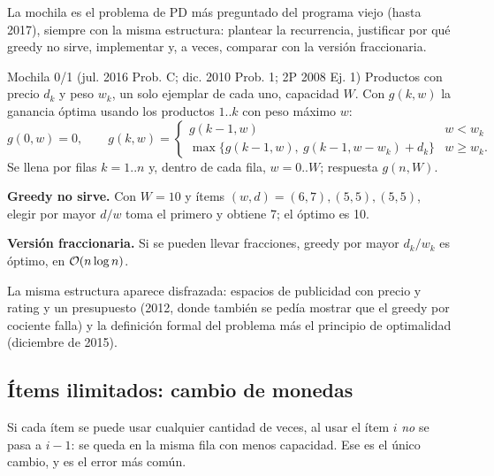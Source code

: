 La mochila es el problema de PD más preguntado del programa viejo (hasta
2017), siempre con la misma estructura: plantear la recurrencia, justificar
por qué greedy no sirve, implementar y, a veces, comparar con la versión
fraccionaria.

\begin{problema}{Mochila 0/1 (jul. 2016 Prob. C; dic. 2010 Prob. 1; 2P 2008 Ej. 1)}
Productos con precio $d_k$ y peso $w_k$, un solo ejemplar de cada uno,
capacidad $W$. Con $g(k,w)$ la ganancia óptima usando los productos
$1..k$ con peso máximo $w$:
\[
g(0,w)=0,\qquad
g(k,w)=\begin{cases}g(k-1,w) & w<w_k\\ \max\{g(k-1,w),\ g(k-1,w-w_k)+d_k\} & w\ge w_k.\end{cases}
\]
Se llena por filas $k=1..n$ y, dentro de cada fila, $w=0..W$; respuesta
$g(n,W)$.

\textbf{Greedy no sirve.} Con $W=10$ y ítems $(w,d)=(6,7),(5,5),(5,5)$,
elegir por mayor $d/w$ toma el primero y obtiene 7; el óptimo es 10.

\textbf{Versión fraccionaria.} Si se pueden llevar fracciones, greedy por
mayor $d_k/w_k$ es óptimo, en $\mathcal{O}(n\log n)$.
\end{problema}

La misma estructura aparece disfrazada: espacios de publicidad con precio y
rating y un presupuesto (2012, donde también se pedía mostrar que el greedy
por cociente falla) y la definición formal del problema más el principio de
optimalidad (diciembre de 2015).

\subsection{Ítems ilimitados: cambio de monedas}

Si cada ítem se puede usar cualquier cantidad de veces, al usar el ítem $i$
\emph{no} se pasa a $i-1$: se queda en la misma fila con menos capacidad.
Ese es el único cambio, y es el error más común.


